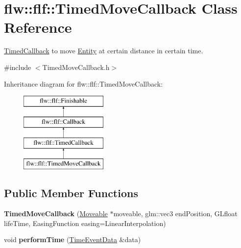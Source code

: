 \hypertarget{classflw_1_1flf_1_1TimedMoveCallback}{}\section{flw\+:\+:flf\+:\+:Timed\+Move\+Callback Class Reference}
\label{classflw_1_1flf_1_1TimedMoveCallback}


\hyperlink{classflw_1_1flf_1_1TimedCallback}{Timed\+Callback} to move \hyperlink{classflw_1_1flf_1_1Entity}{Entity} at certain distance in certain time.  




{\ttfamily \#include $<$Timed\+Move\+Callback.\+h$>$}

Inheritance diagram for flw\+:\+:flf\+:\+:Timed\+Move\+Callback\+:\begin{figure}[H]
\begin{center}
\leavevmode
\includegraphics[height=4.000000cm]{classflw_1_1flf_1_1TimedMoveCallback}
\end{center}
\end{figure}
\subsection*{Public Member Functions}
\begin{DoxyCompactItemize}
\item 
{\bfseries Timed\+Move\+Callback} (\hyperlink{classflw_1_1flf_1_1Moveable}{Moveable} $\ast$moveable, glm\+::vec3 end\+Position, G\+Lfloat life\+Time, Easing\+Function easing=Linear\+Interpolation)\hypertarget{classflw_1_1flf_1_1TimedMoveCallback_a6bec2b74820fe50128426ac406ab3197}{}\label{classflw_1_1flf_1_1TimedMoveCallback_a6bec2b74820fe50128426ac406ab3197}

\item 
void {\bfseries perform\+Time} (\hyperlink{structflw_1_1flf_1_1TimeEventData}{Time\+Event\+Data} \&data)\hypertarget{classflw_1_1flf_1_1TimedMoveCallback_acbb9b67cc2a83714853a674608213c0b}{}\label{classflw_1_1flf_1_1TimedMoveCallback_acbb9b67cc2a83714853a674608213c0b}

\end{DoxyCompactItemize}
